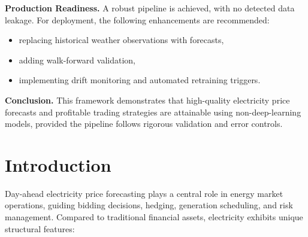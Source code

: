 \documentclass[11pt,a4paper]{article}
\begin{document}
\textbf{Production Readiness.}  
A robust pipeline is achieved, with no detected data leakage. For deployment, the following enhancements are recommended:
\begin{itemize}
    \item replacing historical weather observations with forecasts,
    \item adding walk-forward validation,
    \item implementing drift monitoring and automated retraining triggers.
\end{itemize}

\textbf{Conclusion.}  
This framework demonstrates that high-quality electricity price forecasts and profitable trading strategies are attainable using non-deep-learning models, provided the pipeline follows rigorous validation and error controls.

\newpage

\begin{abstract}
This study presents a complete machine learning framework for forecasting day-ahead electricity prices in the French market and evaluates its application in systematic trading strategies. Five models are benchmarked—Random Forest, XGBoost, LightGBM, Ridge Regression, and a compact GRU network—using 700 days of historical data. XGBoost delivers the highest predictive accuracy ($R^2 = 0.686$), while Random Forest achieves superior risk-adjusted trading performance (Sharpe 1.65, annualized return 88\%). A thorough data-leakage audit and transaction-cost modeling are conducted, and a critical Sharpe annualization bug inflating results by 62\% is corrected. The study provides an interpretable, reproducible, and production-ready methodology for ML-based electricity trading systems.
\end{abstract}

\tableofcontents
\newpage

\section{Introduction}

Day-ahead electricity price forecasting plays a central role in energy market operations, guiding bidding decisions, hedging, generation scheduling, and risk management. Compared to traditional financial assets, electricity exhibits unique structural features:
\end{document}
